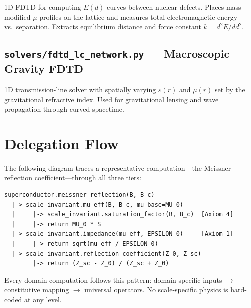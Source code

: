 1D FDTD for computing $E(d)$ curves between nuclear defects.
Places mass-modified $\mu$ profiles on the lattice and measures
total electromagnetic energy vs.\ separation.  Extracts equilibrium
distance and force constant $k = d^2E/dd^2$.

\subsection{\texttt{solvers/fdtd\_lc\_network.py} --- Macroscopic Gravity FDTD}

1D transmission-line solver with spatially varying $\varepsilon(r)$
and $\mu(r)$ set by the gravitational refractive index.  Used for
gravitational lensing and wave propagation through curved spacetime.


\section{Delegation Flow}

The following diagram traces a representative computation---the
Meissner reflection coefficient---through all three tiers:

\begin{verbatim}
superconductor.meissner_reflection(B, B_c)
  |-> scale_invariant.mu_eff(B, B_c, mu_base=MU_0)
  |     |-> scale_invariant.saturation_factor(B, B_c)  [Axiom 4]
  |     |-> return MU_0 * S
  |-> scale_invariant.impedance(mu_eff, EPSILON_0)     [Axiom 1]
  |     |-> return sqrt(mu_eff / EPSILON_0)
  |-> scale_invariant.reflection_coefficient(Z_0, Z_sc)
        |-> return (Z_sc - Z_0) / (Z_sc + Z_0)
\end{verbatim}

Every domain computation follows this pattern: domain-specific
inputs $\to$ constitutive mapping $\to$ universal operators.
No scale-specific physics is hard-coded at any level.
